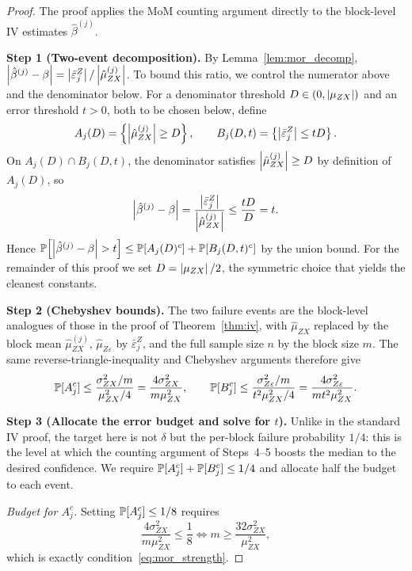 \begin{proof}
The proof applies the MoM counting argument directly to the block-level IV estimates $\hat{\beta}^{(j)}$.

\medskip\noindent\textbf{Step 1 (Two-event decomposition).} By Lemma~\ref{lem:mor_decomp}, $\left|\hat{\beta}^{(j)} - \beta\right| = \left|\bar{\varepsilon}_j^Z\right|/\left|\hat{\mu}_{ZX}^{(j)}\right|$. To bound this ratio, we control the numerator above and the denominator below. For a denominator threshold $D \in (0,\left|\mu_{ZX}\right|)$ and an error threshold $t > 0$, both to be chosen below, define
\[
    A_j(D) = \left\{\left|\hat{\mu}_{ZX}^{(j)}\right| \geq D\right\}, \qquad B_j(D,t) = \left\{\left|\bar{\varepsilon}_j^Z\right| \leq tD\right\}.
\]
On $A_j(D)\cap B_j(D,t)$, the denominator satisfies $\left|\hat{\mu}_{ZX}^{(j)}\right|\geq D$ by definition of $A_j(D)$, so
\[
    \left|\hat{\beta}^{(j)} - \beta\right| = \frac{\left|\bar{\varepsilon}_j^Z\right|}{\left|\hat{\mu}_{ZX}^{(j)}\right|} \leq \frac{tD}{D} = t.
\]
Hence $\Prob\!\left[\abs{\hat\beta^{(j)}-\beta}>t\right] \leq \Prob[A_j(D)^c] + \Prob[B_j(D,t)^c]$ by the union bound. For the remainder of this proof we set $D = \left|\mu_{ZX}\right|/2$, the symmetric choice that yields the cleanest constants.

    \medskip\noindent\textbf{Step 2 (Chebyshev bounds).}
    The two failure events are the block-level analogues of those in the proof of Theorem~\ref{thm:iv}, with $\hat{\mu}_{ZX}$ replaced by the block mean $\hat{\mu}_{ZX}^{(j)}$, $\hat{\mu}_{Z\varepsilon}$ by $\bar{\varepsilon}_j^Z$, and the full sample size $n$ by the block size $m$. The same reverse-triangle-inequality and Chebyshev arguments therefore give
    \[
        \operatorname{\mathbb{P}}[A_j^c] \leq \frac{\sigma_{ZX}^2/m}{\mu_{ZX}^2/4} = \frac{4\sigma_{ZX}^2}{m\mu_{ZX}^2}, \qquad
        \operatorname{\mathbb{P}}[B_j^c] \leq \frac{\sigma_{Z\varepsilon}^2/m}{t^2\mu_{ZX}^2/4} = \frac{4\sigma_{Z\varepsilon}^2}{mt^2\mu_{ZX}^2}.
    \]

    \medskip\noindent\textbf{Step 3 (Allocate the error budget and solve for $t$).}
    Unlike in the standard IV proof, the target here is not $\delta$ but the per-block failure probability $1/4$: this is the level at which the counting argument of Steps~4--5 boosts the median to the desired confidence. We require $\operatorname{\mathbb{P}}[A_j^c]+\operatorname{\mathbb{P}}[B_j^c] \leq 1/4$ and allocate half the budget to each event.

    \emph{Budget for $A_j^c$.}
    Setting $\operatorname{\mathbb{P}}[A_j^c]\leq 1/8$ requires
    \[
        \frac{4\sigma_{ZX}^2}{m\mu_{ZX}^2} \leq \frac{1}{8}
        \iff
        m \geq \frac{32\sigma_{ZX}^2}{\mu_{ZX}^2},
    \]
    which is exactly condition~\eqref{eq:mor_strength}.


\end{proof}
